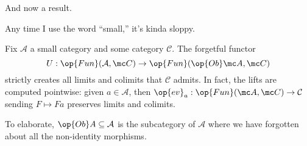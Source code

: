 And now a result.
\begin{quot}[Bryce]
	Any time I use the word ``small,'' it's kinda sloppy.
\end{quot}
\begin{proposition} \label{prop:limitspointwise}
	Fix $\mathcal A$ a small category and some category $\mathcal C$. The forgetful functor
	\[U:\op{Fun}(\mathcal A,\mc C)\to\op{Fun}(\op{Ob}\mc A,\mc C)\]
	strictly creates all limits and colimits that $\mathcal C$ admits. In fact, the lifts are computed pointwise: given $a\in\mathcal A$, then $\op{ev}_a:\op{Fun}(\mc A,\mc C)\to\mathcal C$ sending $F\mapsto Fa$ preserves limits and colimits.
\end{proposition}
To elaborate, $\op{Ob}A\subseteq\mathcal A$ is the subcategory of $\mathcal A$ where we have forgotten about all the non-identity morphisms.
